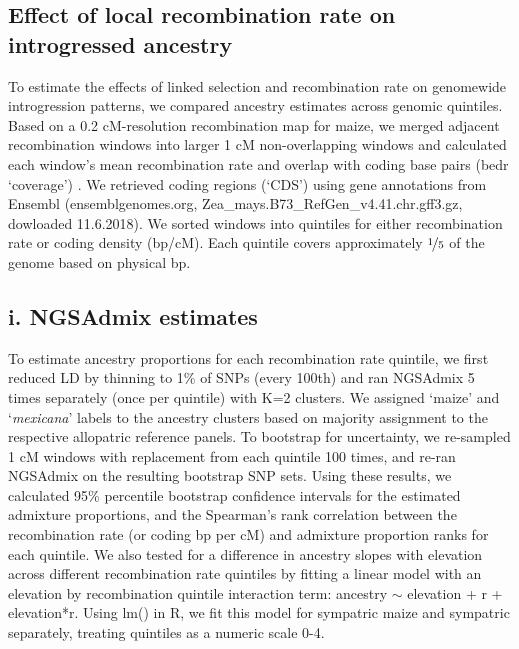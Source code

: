 \subsection*{Effect of local recombination rate on introgressed ancestry}
To estimate the effects of linked selection and recombination rate on genomewide introgression patterns, we compared \mexicana ancestry estimates across genomic quintiles. 
Based on a 0.2 cM-resolution recombination map \cite{Ogut:2015df} for maize, we merged adjacent recombination windows into larger 1 cM non-overlapping windows and calculated each window's mean recombination rate and overlap with coding base pairs (bedr ‘coverage') \cite{R_bedr}. 
We retrieved coding regions (‘CDS') using gene annotations from Ensembl (ensemblgenomes.org, Zea\_mays.B73\_RefGen\_v4.41.chr.gff3.gz, dowloaded 11.6.2018). 
We sorted windows into quintiles for either recombination rate or coding density (bp/cM). 
Each quintile covers approximately $\nicefrac{1}{5}$ of the genome based on physical bp.

\subsection*{i. NGSAdmix estimates}
To estimate ancestry proportions for each recombination rate quintile, we first reduced LD by thinning to 1\% of SNPs (every 100th) and ran NGSAdmix 5 times separately (once per quintile) with K=2 clusters. 
We assigned  ‘maize' and ‘\textit{mexicana}' labels to the ancestry clusters based on majority assignment to the respective allopatric reference panels. 
To bootstrap for uncertainty, we re-sampled 1 cM windows with replacement from each quintile 100 times, and re-ran NGSAdmix on the resulting bootstrap SNP sets. 
Using these results, we calculated 95\% percentile bootstrap confidence intervals for the estimated admixture proportions, and the Spearman's rank correlation between the recombination rate (or coding bp per cM) and admixture proportion ranks for each quintile. 
We also tested for a difference in ancestry slopes with elevation across different recombination rate quintiles by fitting a linear model with an elevation by recombination quintile interaction term: \mexicana ancestry $\sim$ elevation + r + elevation*r. 
Using lm() in R, we fit this model for sympatric maize and sympatric \mexicana separately, treating quintiles as a numeric scale 0-4.

